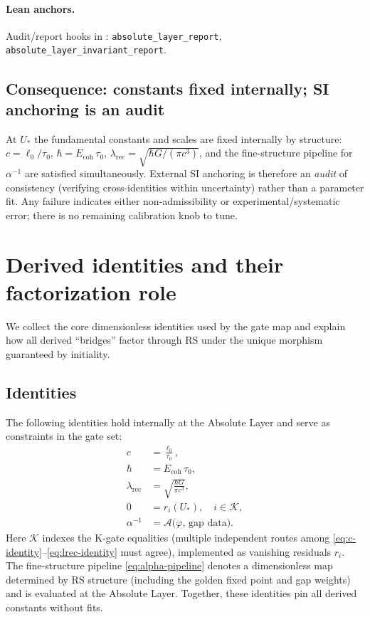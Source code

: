 \documentclass[11pt]{article}
\begin{document}
\paragraph{Lean anchors.} Audit/report hooks in : \texttt{absolute\_layer\_report}, \texttt{absolute\_layer\_invariant\_report}.

\subsection{Consequence: constants fixed internally; SI anchoring is an audit}
At \(U_*\) the fundamental constants and scales are fixed internally by structure: \(c=\ell_0/\tau_0\), \(\hbar=E_{\mathrm{coh}}\,\tau_0\), \(\lambda_{\mathrm{rec}}=\sqrt{\hbar G/(\pi c^3)}\), and the fine\mbox{-}structure pipeline for \(\alpha^{-1}\) are satisfied simultaneously. External SI anchoring is therefore an \emph{audit} of consistency (verifying cross\mbox{-}identities within uncertainty) rather than a parameter fit. Any failure indicates either non\mbox{-}admissibility or experimental/systematic error; there is no remaining calibration knob to tune.

\section{Derived identities and their factorization role}
We collect the core dimensionless identities used by the gate map and explain how all derived ``bridges'' factor through RS under the unique morphism guaranteed by initiality.

\subsection{Identities}
The following identities hold internally at the Absolute Layer and serve as constraints in the gate set:
\begin{align}
  c &= \frac{\ell_0}{\tau_0}, \label{eq:c-identity} \\
  \hbar &= E_{\mathrm{coh}}\,\tau_0, \label{eq:hbar-identity} \\
  \lambda_{\mathrm{rec}} &= \sqrt{\frac{\hbar G}{\pi c^3}}, \label{eq:lrec-identity} \\
  0 &= r_i(U_*), \quad i\in\mathcal{K}, \label{eq:kgates-zero} \\
  \alpha^{-1} &= \mathcal{A}\bigl(\varphi,\,\text{gap data}\bigr). \label{eq:alpha-pipeline}
\end{align}
Here \(\mathcal{K}\) indexes the K\mbox{-}gate equalities (multiple independent routes among \eqref{eq:c-identity}--\eqref{eq:lrec-identity} must agree), implemented as vanishing residuals \(r_i\). The fine\mbox{-}structure pipeline \eqref{eq:alpha-pipeline} denotes a dimensionless map determined by RS structure (including the golden fixed point and gap weights) and is evaluated at the Absolute Layer. Together, these identities pin all derived constants without fits.
\end{document}

